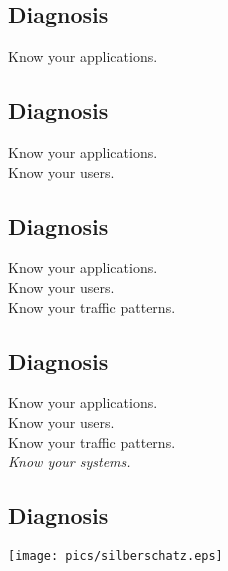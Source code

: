 \documentclass[xga]{xdvislides}
\begin{document}
\subsection{Diagnosis}
\vspace{.5in}
\begin{center}
	\Huge
	Know your applications. \\
\end{center}
\Normalsize

\subsection{Diagnosis}
\vspace{.5in}
\begin{center}
	\Huge
	Know your applications. \\
	\vspace{.4in}
	Know your users. \\
\end{center}
\Normalsize

\subsection{Diagnosis}
\vspace{.5in}
\begin{center}
	\Huge
	Know your applications. \\
	\vspace{.4in}
	Know your users. \\
	\vspace{.4in}
	Know your traffic patterns. \\
\end{center}
\Normalsize

\subsection{Diagnosis}
\vspace{.5in}
\begin{center}
	\Huge
	Know your applications. \\
	\vspace{.4in}
	Know your users. \\
	\vspace{.4in}
	Know your traffic patterns. \\
	\vspace{.4in}
	{\em Know your systems.}
\end{center}
\Normalsize

\subsection{Diagnosis}
\begin{center}
	\texttt{[image: pics/silberschatz.eps]}
\end{center}
\end{document}
